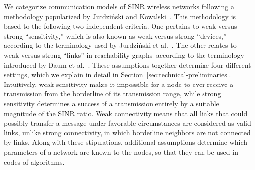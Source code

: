 \documentclass[11pt]{article}
\begin{document}
We categorize communication models of SINR wireless networks following a methodology popularized by Jurdzi\'nski and Kowalski~\cite{JurdzinskiK-encyclopedia}.
This methodology is based to the following two independent criteria.
One pertains to weak versus strong ``sensitivity,'' which is also known as weak versus strong ``devices,'' according to the terminology used by Jurdzi\'nski et al.~\cite{JKS-ICALP-13}.
The other relates to weak versus strong ``links'' in reachability graphs, according to the terminology introduced by Daum et al.~\cite{DGKN13}.
These assumptions together determine four different settings, which we explain in detail in Section~\ref{sec:technical-preliminaries}.
Intuitively, weak-sensitivity makes it impossible for a node to ever receive a transmission from the borderline of its transmission range, while strong sensitivity determines a success of a transmission entirely by a suitable magnitude of the SINR ratio.
Weak connectivity means that all links that could possibly transfer a message under favorable circumstances are considered as valid links, unlike strong connectivity, in which borderline neighbors are not connected by links.
Along with these stipulations, additional assumptions determine which parameters of a network are known to the nodes, so that they can be used in codes of algorithms.




\newcommand{\RB}{\raisebox{12pt}{}}
\newcommand{\LB}{\raisebox{-6pt}{}}
\end{document}
